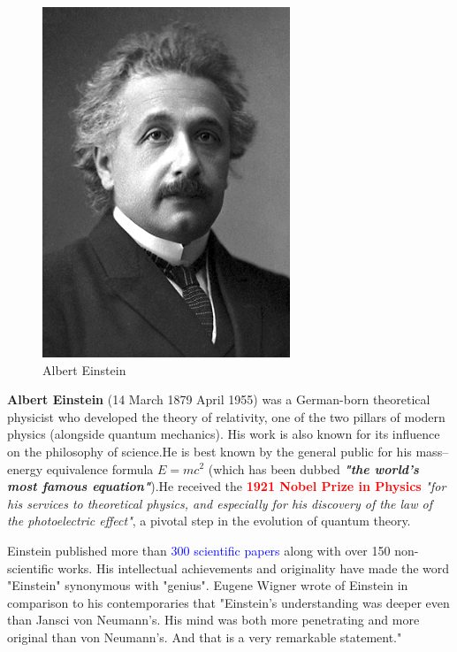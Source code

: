 \documentclass{article}
\begin{document}
\begin{figure}
\vspace{-10pt}

\begin{center}
\includegraphics[width=.5\textwidth]{figures/Albert_Einstein_(Nobel).png}
\end{center}

\vspace{-10pt}
\caption{Albert Einstein}
\vspace{-10pt}
\end{figure}

\textbf{Albert Einstein} (14 March 1879  April 1955) was a German-born theoretical physicist who developed the theory of relativity, one of the two pillars of modern physics (alongside quantum mechanics). His work is also known for its influence on the philosophy of science.He is best known by the general public for his mass–energy equivalence formula \textbf{$ E = mc^2 $} (which has been dubbed \textbf{\textit{"the world's most famous equation"}}).He received the \textcolor{red}{\textbf{1921 Nobel Prize in Physics}} \textit{"for his services to theoretical physics, and especially for his discovery of the law of the photoelectric effect"}, a pivotal step in the evolution of quantum theory.


Einstein published more than \textcolor{blue}{300 scientific papers} along with over 150 non-scientific works. His intellectual achievements and originality have made the word "Einstein" synonymous with "genius". Eugene Wigner wrote of Einstein in comparison to his contemporaries that "Einstein's understanding was deeper even than Jansci von Neumann's. His mind was both more penetrating and more original than von Neumann's. And that is a very remarkable statement."
\end{document}
